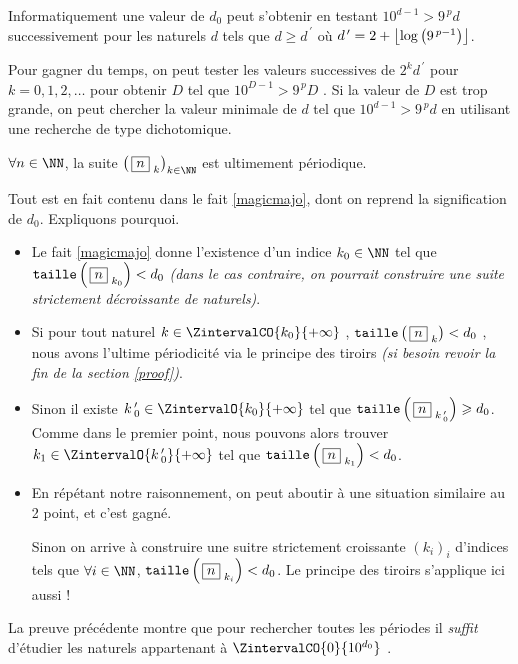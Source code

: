 \medskip

\begin{remark}
	Informatiquement une valeur de $d_0$ peut s'obtenir en testant $10^{d - 1} > 9^{\,p} d$ successivement pour les naturels $d$ tels que $d \geqslant d^{\,\prime}$ où $d^{\,\prime} = 2 + \left\lfloor  \log \left( 9^{\,p-1} \right) \right\rfloor$.
	
	\medskip
	
	Pour gagner du temps, on peut tester les valeurs successives de $2^k d^{\,\prime}$ pour $k = 0, 1, 2, \dots$ pour obtenir $D$ tel que $10^{D - 1} > 9^{\,p} D$ . Si la valeur de $D$ est trop grande, on peut chercher la valeur minimale de $d$ tel que $10^{d - 1} > 9^{\,p} d$ en utilisant une recherche de type dichotomique. 
\end{remark}


\medskip

\begin{fact}\label{beautifulproof}
	$\forall n \in \NN$, la suite $\left( \, \sqseq{n}{k} \right)_{k \in \NN}$ est ultimement périodique.
\end{fact}

\begin{proof*}
	Tout est en fait contenu dans le fait \ref{magicmajo}, dont on reprend la signification de $d_0$. Expliquons pourquoi.
	\begin{itemize}[label = \textbullet]
		\item Le fait \ref{magicmajo} donne l'existence d'un indice $k_0 \in \NN$ tel que $\operatorname{\text{\normalfont\texttt{taille}}}\left( \, \fbox{$n$}_{\,\,k_0} \right) < d_0$ \emph{(dans le cas contraire, on pourrait construire une suite strictement décroissante de naturels)}.

		\item Si pour tout naturel $k \in \ZintervalCO{k_0}{+\infty}$ , $\operatorname{\text{\normalfont\texttt{taille}}}\left( \, \fbox{$n$}_{\,\,k} \right) < d_0$ , nous avons l'ultime périodicité via le principe des tiroirs \emph{(si besoin revoir la fin de la section \ref{proof})}.

		\item Sinon il existe $k\,^\prime_0 \in \ZintervalO{k_0}{+\infty}$ tel que $\operatorname{\text{\normalfont\texttt{taille}}}\left( \, \fbox{$n$}_{\,\,k\,^\prime_0} \right) \geqslant d_0$. Comme dans le premier point, nous pouvons alors trouver $k_1 \in \ZintervalO{k\,^\prime_0}{+\infty}$ tel que $\operatorname{\text{\normalfont\texttt{taille}}}\left( \, \fbox{$n$}_{\,\,k_1} \right) < d_0$.
		
		\item En répétant notre raisonnement,
		on peut aboutir à une situation similaire au 2\ieme{} point, et c'est gagné. 
		
		\noindent
		Sinon on arrive à construire une suitre strictement croissante $\left( k_i \right)_i$ d'indices tels que $\forall i \in \NN$, $\operatorname{\text{\normalfont\texttt{taille}}}\left( \, \fbox{$n$}_{\,\,k_i} \right) < d_0$. Le principe des tiroirs s'applique ici aussi !
	\end{itemize}
\end{proof*}



\medskip

\begin{remark}
	La preuve précédente montre que pour rechercher toutes les périodes il \emph{\og suffit \fg} d'étudier les naturels appartenant à $\ZintervalCO{0}{10^{d_0}}$ .
\end{remark}
